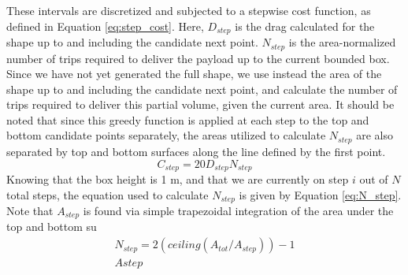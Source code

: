 \documentclass[11pt]{article}
\begin{document}
These intervals are discretized and subjected to a stepwise cost function, as defined in Equation \ref{eq:step_cost}. Here, $D_{step}$ is the drag calculated for the shape up to and including the candidate next point. $N_{step}$ is the area-normalized number of trips required to deliver the payload up to the current bounded box. Since we have not yet generated the full shape, we use instead the area of the shape up to and including the candidate next point, and calculate the number of trips required to deliver this partial volume, given the current area. It should be noted that since this greedy function is applied at each step to the top and bottom candidate points separately, the areas utilized to calculate $N_{step}$ are also separated by top and bottom surfaces along the line defined by the first point.
\begin{equation} \label{eq:step_cost}
    C_{step} = 20 D_{step} N_{step}
\end{equation}
Knowing that the box height is 1 m, and that we are currently on step $i$ out of $N$ total steps, the equation used to calculate $N_{step}$ is given by Equation \ref{eq:N_step}. Note that $A_{step}$ is found via simple trapezoidal integration of the area under the top and bottom su
\begin{align} \label{eq:N_step}
    N_{step} = 2(ceiling(A_{tot}/A_{step}))-1 \\
    A{step}
\end{align}
\end{document}
